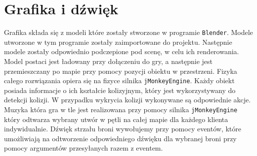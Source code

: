 \documentclass[]{report}
\newcommand{\code}[1]{\colorbox{codegray}{\texttt{#1}}}
\begin{document}
\chapter*{Grafika i dźwięk}
Grafika składa się z modeli które zostały stworzone w programie \code{Blender}.
Modele utworzone w tym programie zostały zaimportowane do projektu.
Następnie modele zostały odpowiednio podczepione pod scenę, w celu ich renderowania.
Model postaci jest ładowany przy dołączeniu do gry, a następnie jest przemieszczany po mapie przy pomocy pozycji obiektu w przestrzeni.
Fizyka całego rozwiązania opiera się na fizyce silnika \code{jMonkeyEngine}.
Każdy obiekt posiada informacje o ich kształcie kolizyjnym, który jest wykorzystywany do detekcji kolizji.
W przypadku wykrycia kolizji wykonywane są odpowiednie akcje.
Muzyka która gra w tle jest realizowana przy pomocy silnika \code{jMonkeyEngine} który odtwarza wybrany utwór w pętli na całej mapie dla każdego klienta indywidualnie.
Dźwięk strzału broni wywołujemy przy pomocy eventów, które umożliwiają na odtworzenie odpowiedniego dźwięku dla wybranej broni przy pomocy argumentów przesyłanych razem z eventem.
\end{document}
